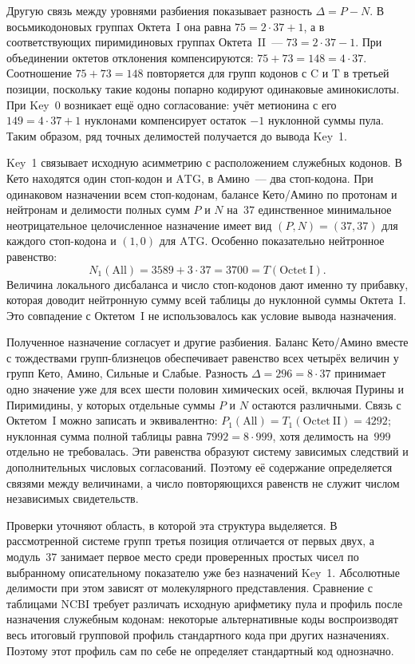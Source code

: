 \documentclass[11pt,a4paper]{article}
\renewcommand{\_}{\origunderscore\allowbreak}
\begin{document}
Другую связь между уровнями разбиения показывает разность
$\Delta=P-N$. В восьмикодоновых группах Октета~I она равна
$75=2\cdot37+1$, а в соответствующих пиримидиновых группах
Октета~II~--- $73=2\cdot37-1$. При объединении октетов
отклонения компенсируются: $75+73=148=4\cdot37$.
Соотношение $75+73=148$ повторяется для групп кодонов
с $\mathrm{C}$ и $\mathrm{T}$ в третьей позиции,
поскольку такие кодоны попарно кодируют одинаковые
аминокислоты.
При Key~0 возникает ещё одно согласование: учёт метионина
с его $149=4\cdot37+1$ нуклонами компенсирует остаток $-1$
нуклонной суммы пула. Таким образом, ряд точных делимостей
получается до вывода Key~1.

Key~1 связывает исходную асимметрию с расположением служебных
кодонов. В Кето находятся один стоп-кодон и $\mathrm{ATG}$,
в Амино~--- два стоп-кодона. При одинаковом назначении всем
стоп-кодонам, балансе Кето/Амино по протонам и нейтронам
и делимости полных сумм $P$ и $N$ на~$37$ единственное
минимальное неотрицательное целочисленное назначение имеет вид
$(P,N)=(37,37)$ для каждого стоп-кодона и $(1,0)$ для
$\mathrm{ATG}$. Особенно показательно нейтронное равенство:
\[
N_1(\mathrm{All})=3589+3\cdot37
                 =3700=T(\mathrm{Octet~I}).
\]
Величина локального дисбаланса и число стоп-кодонов дают
именно ту прибавку, которая доводит нейтронную сумму всей
таблицы до нуклонной суммы Октета~I. Это совпадение с Октетом~I
не использовалось как условие вывода назначения.

Полученное назначение согласует и другие разбиения.
Баланс Кето/Амино вместе с тождествами групп-близнецов
обеспечивает равенство всех четырёх величин у групп Кето,
Амино, Сильные и Слабые. Разность $\Delta=296=8\cdot37$
принимает одно значение уже для всех шести половин химических
осей, включая Пурины и Пиримидины, у которых отдельные суммы
$P$ и $N$ остаются различными. Связь с Октетом~I можно записать
и эквивалентно: $P_1(\mathrm{All})=T_1(\mathrm{Octet~II})=4292$;
нуклонная сумма полной таблицы равна $7992=8\cdot999$,
хотя делимость на~$999$ отдельно не требовалась.
Эти равенства образуют систему зависимых следствий и
дополнительных числовых согласований. Поэтому её содержание
определяется связями между величинами, а число повторяющихся
равенств не служит числом независимых свидетельств.

Проверки уточняют область, в которой эта структура выделяется.
В рассмотренной системе групп третья позиция отличается от
первых двух, а модуль~$37$ занимает первое место среди
проверенных простых чисел по выбранному описательному
показателю уже без назначений Key~1. Абсолютные делимости
при этом зависят от молекулярного представления.
Сравнение с таблицами NCBI требует различать исходную
арифметику пула и профиль после назначения служебным кодонам:
некоторые альтернативные коды воспроизводят весь итоговый
групповой профиль стандартного кода при других назначениях.
Поэтому этот профиль сам по себе не определяет стандартный
код однозначно.
\end{document}

